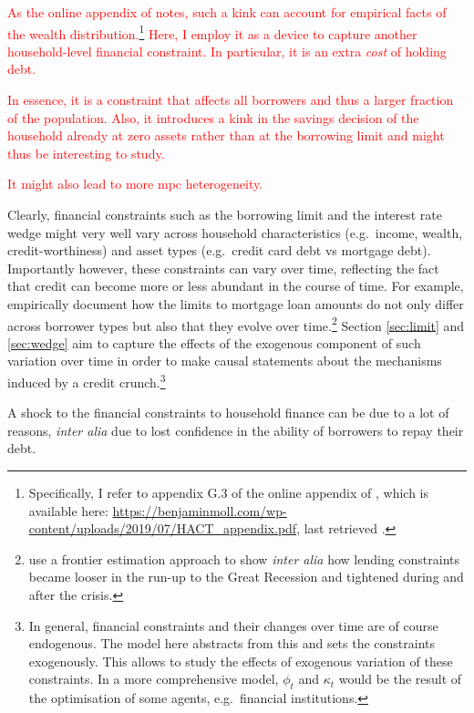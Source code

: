 \documentclass[12pt]{article} %
\numberwithin{equation}{section} %
\numberwithin{figure}{section}
\numberwithin{table}{section}
\begin{document}
\textcolor{red}{As the online appendix of \textcite{achdou2022} notes, such a kink can account for empirical facts of the wealth distribution.\footnote{Specifically, I refer to appendix G.3 of the online appendix of \textcite{achdou2022}, which is available here: \url{https://benjaminmoll.com/wp-content/uploads/2019/07/HACT_appendix.pdf}, last retrieved .} Here, I employ it as a device to capture another household-level financial constraint. In particular, it is an extra \textit{cost} of holding debt.}

\textcolor{red}{In essence, it is a constraint that affects all borrowers and thus a larger fraction of the population. Also, it introduces a kink in the savings decision of the household already at zero assets rather than at the borrowing limit and might thus be interesting to study.}

\textcolor{red}{It might also lead to more \Gls{mpc} heterogeneity.}

Clearly, financial constraints such as the borrowing limit and the interest rate wedge might very well vary across household characteristics (e.g.~income, wealth, credit-worthiness) and asset types (e.g.~credit card debt vs mortgage debt). Importantly however, these constraints can vary over time, reflecting the fact that credit can become more or less abundant in the course of time. For example, \textcite{anenberg2018} empirically document how the limits to mortgage loan amounts do not only differ across borrower types but also that they evolve over time.\footnote{\textcite{anenberg2018} use a frontier estimation approach to show \textit{inter alia} how lending constraints became looser in the run-up to the Great Recession and tightened during and after the crisis.} Section \ref{sec:limit} and \ref{sec:wedge} aim to capture the effects of the exogenous component of such variation over time in order to make causal statements about the mechanisms induced by a credit crunch.\footnote{In general, financial constraints and their changes over time are of course endogenous. The model here abstracts from this and sets the constraints exogenously. This allows to study the effects of exogenous variation of these constraints. In a more comprehensive model, $\phi_t$ and $\kappa_t$ would be the result of the optimisation of some agents, e.g.~financial institutions.}

A shock to the financial constraints to household finance can be due to a lot of reasons, \textit{inter alia} due to lost confidence in the ability of borrowers to repay their debt.
\end{document}
